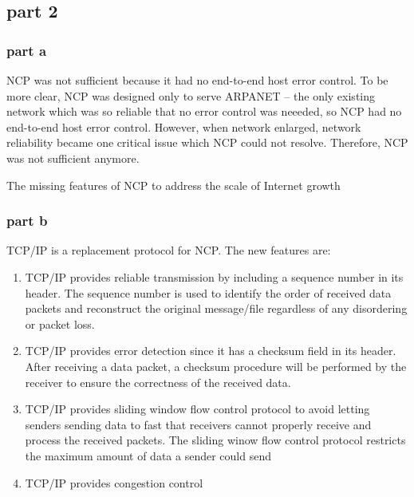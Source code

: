 \subsection{part 2}
\subsubsection{part a} NCP was not sufficient because it had no end-to-end host error control. To be more clear, NCP was designed only to serve ARPANET -- the only existing network which was so reliable that no error control was neeeded, so NCP had no end-to-end host error control. However, when network enlarged, network reliability became one critical issue which NCP could not resolve. Therefore, NCP was not sufficient anymore.

The missing features of NCP to address the scale of Internet growth
\subsubsection{part b} TCP/IP is a replacement protocol for NCP. The new features are:

\begin{enumerate}
\item TCP/IP provides reliable transmission by including a sequence number in its header. The sequence number is used to identify the order of received data packets and reconstruct the original message/file regardless of any disordering or packet loss.
\item TCP/IP provides error detection since it has a checksum field in its header. After receiving a data packet, a checksum procedure will be performed by the receiver to ensure the correctness of the received data.
\item TCP/IP provides sliding window flow control protocol to avoid letting senders sending data to fast that receivers cannot properly receive and process the received packets. The sliding winow flow control protocol restricts the maximum amount of data a sender could send
\item TCP/IP provides congestion control
\end{enumerate}












